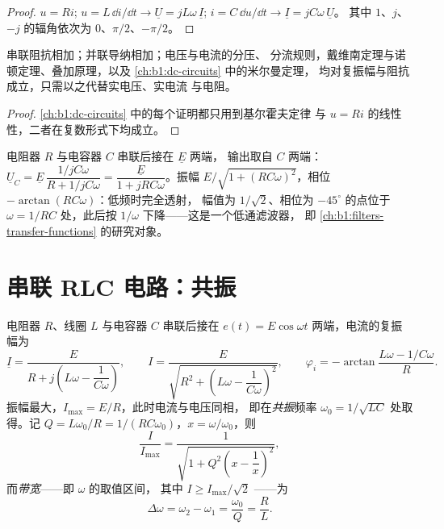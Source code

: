 \begin{proof}
$u = Ri$; $u = L\,\dd i/\dd t \to \underline U = jL\omega\,\underline I$;
$i = C\,\dd u/\dd t \to \underline I = jC\omega\,\underline U$。
其中 $1$、$j$、$-j$ 的辐角依次为 $0$、$\pi/2$、$-\pi/2$。
\end{proof}

\begin{proposition}[关联；分压与分流；定理]\label{prop:b1:sinusoidal-impedance:assoc}
串联阻抗相加；并联导纳相加；电压与电流的分压、
分流规则，戴维南定理与诺顿定理、叠加原理，以及
\cref{ch:b1:dc-circuits} 中的米尔曼定理，
均对复振幅与阻抗成立，只需以之代替实电压、实电流
与电阻。
\end{proposition}

\begin{proof}
\cref{ch:b1:dc-circuits} 中的每个证明都只用到基尔霍夫定律
与 $u = Ri$ 的线性性，二者在复数形式下均成立。
\end{proof}

\begin{example}[RC 分压器]\label{ex:b1:sinusoidal-impedance:rcdivider}
电阻器 $R$ 与电容器 $C$ 串联后接在 $\underline E$ 两端，
输出取自 $C$ 两端：$\underline U_C = \underline E\,\dfrac{1/jC\omega}
{R + 1/jC\omega} = \dfrac{\underline E}{1 + jRC\omega}$。振幅
$E/\sqrt{1 + (RC\omega)^2}$，相位 $-\arctan(RC\omega)$：低频时完全透射，
幅值为 $1/\sqrt2$、相位为 $-45^\circ$ 的点位于
$\omega = 1/RC$ 处，此后按 $1/\omega$ 下降——这是一个低通滤波器，
即 \cref{ch:b1:filters-transfer-functions} 的研究对象。
\end{example}

\section{串联 RLC 电路：共振}

\begin{theorem}[电流共振]\label{thm:b1:sinusoidal-impedance:resonance}
电阻器 $R$、线圈 $L$ 与电容器 $C$ 串联后接在
$e(t) = E\cos\omega t$ 两端，电流的复振幅为
\[
\underline I = \frac{E}{R + j\left(L\omega - \dfrac{1}{C\omega}\right)},
\qquad
I = \frac{E}{\sqrt{R^2 + \left(L\omega - \dfrac{1}{C\omega}\right)^2}},
\qquad
\varphi_i = -\arctan\frac{L\omega - 1/C\omega}{R} .
\]
振幅最大，$I_{\max} = E/R$，此时电流与电压同相，
即在\emph{共振}频率 $\omega_0 = 1/\sqrt{LC}$ 处取得。记
$Q = L\omega_0/R = 1/(RC\omega_0)$，$x = \omega/\omega_0$，则
\[
\frac{I}{I_{\max}} = \frac{1}{\sqrt{1 + Q^2\left(x - \dfrac1x\right)^2}} ,
\]
而\emph{带宽}——即 $\omega$ 的取值区间，
其中 $I \geq I_{\max}/\sqrt2$ ——为
\[
\Delta\omega = \omega_2 - \omega_1 = \frac{\omega_0}{Q} = \frac{R}{L} .
\]
\end{theorem}

